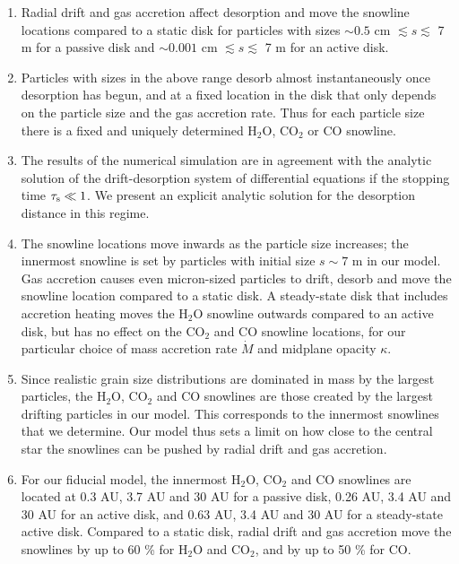 \documentclass[apj]{emulateapj}
\begin{document}
\begin{enumerate}
\item Radial drift and gas accretion affect desorption and move the snowline locations compared to a static disk for particles with sizes $\sim$$0.5$ cm $\lesssim s \lesssim$ 7 m for a passive disk and $\sim$$0.001$ cm $\lesssim s \lesssim$ 7 m for an active disk. %

\item Particles with sizes in the above range desorb almost instantaneously once desorption has begun, and at a fixed location in the disk that only depends on the particle size and the gas accretion rate. Thus for each particle size there is a fixed and uniquely determined H$_2$O, CO$_2$ or CO snowline. 

\item The results of the numerical simulation are in agreement with the analytic solution of the drift-desorption system of differential equations if the stopping time $\tau_{\rm s} \ll 1$. We present an explicit analytic solution for the desorption distance in this regime.  

\item The snowline locations move inwards as the particle size increases; the innermost snowline is set by particles with initial size $s \sim 7$ m in our model. Gas accretion causes even micron-sized particles to drift, desorb and move the snowline location compared to a static disk. A steady-state disk that includes accretion heating moves the H$_2$O snowline outwards compared to an active disk, but has no effect on the CO$_2$ and CO snowline locations, for our particular choice of mass accretion rate $\dot{M}$ and midplane opacity $\kappa$. %

\item Since realistic grain size distributions are dominated in mass by the largest particles, the H$_2$O, CO$_2$ and CO snowlines are those created by the largest drifting particles in our model. This corresponds to the innermost snowlines that we determine. Our model thus sets a limit on how close to the central star the snowlines can be pushed by radial drift and gas accretion.

\item For our fiducial model, the innermost H$_2$O, CO$_2$ and CO snowlines are located at 0.3 AU, 3.7 AU and 30 AU for a passive disk, 0.26 AU, 3.4 AU and 30 AU for an active disk, and 0.63 AU, 3.4 AU and 30 AU for a steady-state active disk. Compared to a static disk, radial drift and gas accretion move the snowlines by up to 60 \% for H$_2$O and CO$_2$, and by up to 50 \% for CO. 


\end{enumerate}
\end{document}
